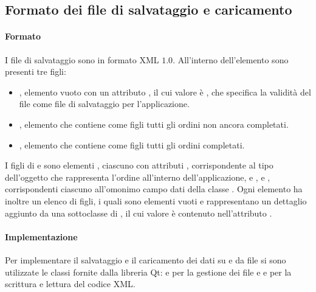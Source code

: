 \subsection{Formato dei file di salvataggio e caricamento} %
\label{sub:formato_dei_file_di_salvataggio_e_caricamento}
\paragraph{Formato} %
\label{par:formato}
I file di salvataggio sono in formato XML $1.0$. All'interno dell'elemento  sono presenti tre figli:
\begin{itemize}
	\item {}, elemento vuoto con un attributo , il cui valore è , che specifica la validità del file come file di salvataggio per l'applicazione.
	\item {}, elemento che contiene come figli tutti gli ordini non ancora completati.
	\item {}, elemento che contiene come figli tutti gli ordini completati.
\end{itemize}
I figli di  e  sono elementi , ciascuno con attributi , corrispondente al tipo dell'oggetto che rappresenta l'ordine all'interno dell'applicazione, e ,  e , corrispondenti ciascuno all'omonimo campo dati della classe . Ogni elemento  ha inoltre un elenco di figli, i quali sono elementi vuoti  e rappresentano un dettaglio aggiunto da una sottoclasse di , il cui valore è contenuto nell'attributo .
\paragraph{Implementazione} %
\label{par:implementazione}
Per implementare il salvataggio e il caricamento dei dati su e da file si sono utilizzate le classi fornite dalla libreria Qt:  e  per la gestione dei file e  e  per la scrittura e lettura del codice XML.
